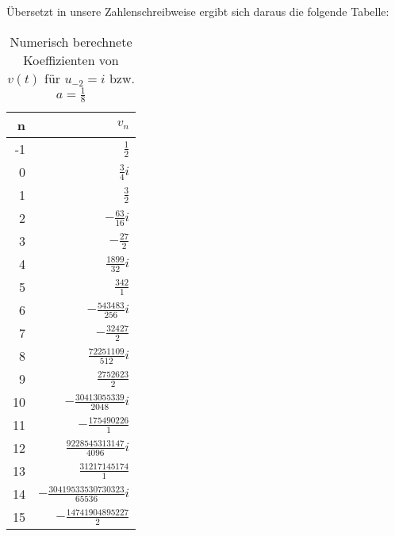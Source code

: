 Übersetzt in unsere Zahlenschreibweise ergibt sich daraus die folgende Tabelle:
\begin{table}[H] %
\begin{center}
\begin{tabular}{|r||r|}
\hline
n        & $v_n$
\\\hline\hline
  -1 & $\frac{1}{2}$
\\0  & $\frac{3}{4}i$
\\1  & $\frac{3}{2}$
\\2  & $-\frac{63}{16}i$
\\3  & $-\frac{27}{2}$
\\4  & $\frac{1899}{32}i$
\\5  & $\frac{342}{1}$
\\6  & $-\frac{543483}{256}i$
\\7  & $-\frac{32427}{2}$
\\8  & $\frac{72251109}{512}i$
\\9  & $\frac{2752623}{2}$
\\10 & $-\frac{30413055339}{2048}i$
\\11 & $-\frac{175490226}{1}$
\\12 & $\frac{9228545313147}{4096}i$
\\13 & $\frac{31217145174}{1}$
\\14 & $-\frac{30419533530730323}{65536}i$
\\15 & $-\frac{14741904895227}{2}$
\\\hline
\end{tabular}
\caption{Numerisch berechnete Koeffizienten von $v(t)$ für $u_{-2}=i$ bzw.
  $a=\frac{1}{8}$}
\label{tab:koeff_a=0.125}
\end{center}
\end{table}

